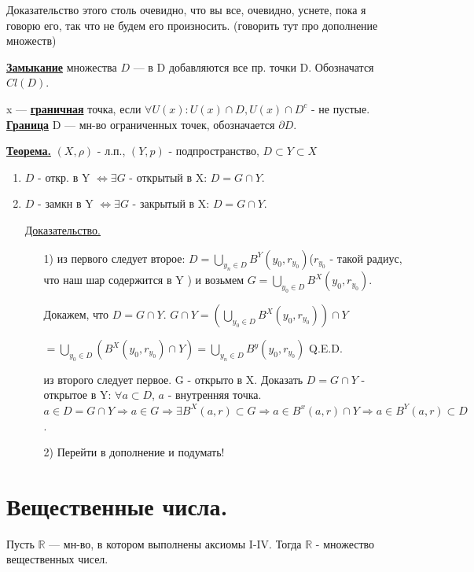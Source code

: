 \documentclass{article}
\newcommand{\deff}[1]{\underline{\textbf{#1}}}
\newcommand{\thmm}[1]{\underline{\textbf{#1}}}
\begin{document}
Доказательство этого столь очевидно, что вы все, очевидно, уснете, пока я говорю его, так что не будем его произносить. (говорить тут про дополнение множеств)

\deff{Замыкание} множества $D$ --- в D добавляются все пр. точки D. Обозначатся $Cl(D)$.  

x --- \deff{граничная} точка, если $\forall U(x): U(x) \cap D, U(x) \cap D^c$ - не пустые. \deff{Граница} D --- мн-во ограниченных точек, обозначается $\partial D$.

\thmm{Теорема.} $(X,\rho)$ - л.п., $(Y,p)$ - подпространство, $D \subset Y \subset X$

\begin{enumerate}
    \item $D$ - откр. в Y $\Leftrightarrow \exists G$ - открытый в X: $D = G \cap Y$.
    \item $D$ - замкн в Y $\Leftrightarrow \exists G$ - закрытый в X: $D = G \cap Y$.
\end{enumerate}
\begin{enumerate}
        \item[] \uline{Доказательство.}
        \begin{enumerate}
            \item[1)] из первого следует второе: $D = \bigcup\limits_{y_n \in D}B^Y(y_0,r_{y_0})$($r_{y_0}$ - такой радиус, что наш шар содержится в Y ) и возьмем $G= \bigcup\limits_{y_0 \in D}B^X(y_0,r_{y_0})$.

            Докажем, что $D = G \cap Y$. $G \cap Y = ( \bigcup\limits_{y_0\in D}B^X(y_0,r_{y_0})) \cap Y$
            
            $ = \bigcup\limits_{y_0 \in D}(B^X(y_0,r_{y_0}) \cap Y) = \bigcup\limits_{y_n \in D}B^y(y_0,r_{y_0})$  Q.E.D.

            из второго следует первое. G - открыто в X. Доказать $D = G\cap Y$ - открытое в Y: $\forall a \subset D$, $a$ - внутренняя точка. $a\in D = G \cap Y \Rightarrow a \in G \Rightarrow \exists B^X(a,r) \subset G \Rightarrow a \in B^x(a,r) \cap Y \Rightarrow a \in B^Y(a,r) \subset D$.
             \item[2)] Перейти в дополнение и подумать!
        \end{enumerate}
    \end{enumerate}
    
    



\pagebreak


\section{Вещественные числа.}
Пусть $\mathbb{R}$ --- мн-во, в котором выполнены аксиомы I-IV. Тогда $\mathbb{R}$ - множество вещественных чисел.
\end{document}
